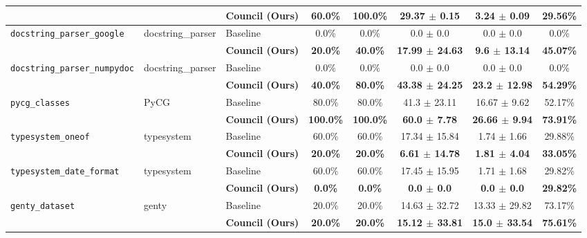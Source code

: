 \begin{table}[t]
\begin{tabular}{lll c c c c c}
 & & \textbf{Council (Ours)} & \textbf{60.0\%} & \textbf{100.0\%} & \textbf{29.37 $\pm$ 0.15} & \textbf{3.24 $\pm$ 0.09} & \textbf{29.56\%} \\
\midrule
\multirow{2}{*}{\texttt{docstring\_parser\_google}} & \multirow{2}{*}{docstring\_parser} & Baseline & 0.0\% & 0.0\% & 0.0 $\pm$ 0.0 & 0.0 $\pm$ 0.0 & 0.0\% \\
 & & \textbf{Council (Ours)} & \textbf{20.0\%} & \textbf{40.0\%} & \textbf{17.99 $\pm$ 24.63} & \textbf{9.6 $\pm$ 13.14} & \textbf{45.07\%} \\
\midrule
\multirow{2}{*}{\texttt{docstring\_parser\_numpydoc}} & \multirow{2}{*}{docstring\_parser} & Baseline & 0.0\% & 0.0\% & 0.0 $\pm$ 0.0 & 0.0 $\pm$ 0.0 & 0.0\% \\
 & & \textbf{Council (Ours)} & \textbf{40.0\%} & \textbf{80.0\%} & \textbf{43.38 $\pm$ 24.25} & \textbf{23.2 $\pm$ 12.98} & \textbf{54.29\%} \\
\midrule
\multirow{2}{*}{\texttt{pycg\_classes}} & \multirow{2}{*}{PyCG} & Baseline & 80.0\% & 80.0\% & 41.3 $\pm$ 23.11 & 16.67 $\pm$ 9.62 & 52.17\% \\
 & & \textbf{Council (Ours)} & \textbf{100.0\%} & \textbf{100.0\%} & \textbf{60.0 $\pm$ 7.78} & \textbf{26.66 $\pm$ 9.94} & \textbf{73.91\%} \\
\midrule
\multirow{2}{*}{\texttt{typesystem\_oneof}} & \multirow{2}{*}{typesystem} & Baseline & 60.0\% & 60.0\% & 17.34 $\pm$ 15.84 & 1.74 $\pm$ 1.66 & 29.88\% \\
 & & \textbf{Council (Ours)} & \textbf{20.0\%} & \textbf{20.0\%} & \textbf{6.61 $\pm$ 14.78} & \textbf{1.81 $\pm$ 4.04} & \textbf{33.05\%} \\
\midrule
\multirow{2}{*}{\texttt{typesystem\_date\_format}} & \multirow{2}{*}{typesystem} & Baseline & 60.0\% & 60.0\% & 17.45 $\pm$ 15.95 & 1.71 $\pm$ 1.68 & 29.82\% \\
 & & \textbf{Council (Ours)} & \textbf{0.0\%} & \textbf{0.0\%} & \textbf{0.0 $\pm$ 0.0} & \textbf{0.0 $\pm$ 0.0} & \textbf{29.82\%} \\
\midrule
\multirow{2}{*}{\texttt{genty\_dataset}} & \multirow{2}{*}{genty} & Baseline & 20.0\% & 20.0\% & 14.63 $\pm$ 32.72 & 13.33 $\pm$ 29.82 & 73.17\% \\
 & & \textbf{Council (Ours)} & \textbf{20.0\%} & \textbf{20.0\%} & \textbf{15.12 $\pm$ 33.81} & \textbf{15.0 $\pm$ 33.54} & \textbf{75.61\%} \\
\bottomrule
\end{tabular}
\end{table}